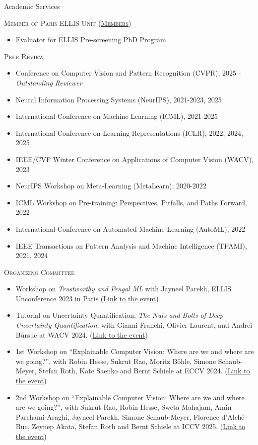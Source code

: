 \documentclass{resume} %
\begin{document}
\begin{rSection}{Academic Services}

\textsc{Member of Paris ELLIS Unit (\href{https://ellis.eu/units/paris}{Members})}
\begin{itemize}[label=$\cdot$]
    \item Evaluator for ELLIS Pre-screening PhD Program
\end{itemize}

\textsc{Peer Review}
\begin{itemize}[label=$\cdot$]
    \item Conference on Computer Vision and Pattern Recognition (CVPR), 2025 - \emph{Outstanding Reviewer}
    \item Neural Information Processing Systems (NeurIPS), 2021-2023, 2025
    \item International Conference on Machine Learning (ICML), 2021-2025
    \item International Conference on Learning Representations (ICLR), 2022, 2024, 2025
    \item IEEE/CVF Winter Conference on Applications of Computer Vision (WACV), 2023
    \item NeurIPS Workshop on Meta-Learning (MetaLearn), 2020-2022
    \item ICML Workshop on Pre-training: Perspectives, Pitfalls, and Paths Forward, 2022
    \item International Conference on Automated Machine Learning (AutoML), 2022
    \item IEEE Transactions on Pattern Analysis and Machine Intelligence (TPAMI), 2021, 2024
\end{itemize}

\textsc{Organizing Committee}
\begin{itemize}[label=$\cdot$]
    \item Workshop on \emph{Trustworthy and Frugal ML} with Jayneel Parekh, ELLIS Unconference 2023 in Paris (\href{https://ellisunconference2023.github.io/}{Link to the event})
    \item Tutorial on Uncertainty Quantification: \emph{The Nuts and Bolts of Deep Uncertainty Quantification}, with Gianni Franchi, Olivier Laurent, and Andrei Bursuc at WACV 2024. (\href{https://uqtutorial.github.io/}{Link to the event})
    \item 1st Workshop on ``Explainable Computer Vision: Where are we and where are we going?'', with Robin Hesse, Sukrut Rao, Moritz Böhle, Simone Schaub-Meyer, Stefan Roth, Kate Saenko and Bernt Schiele at ECCV 2024. (\href{https://excv-workshop.github.io/2024/}{Link to the event})
    \item 2nd Workshop on ``Explainable Computer Vision: Where are we and where are we going?'', with Sukrut Rao, Robin Hesse, Sweta Mahajam, Amin Parchami-Araghi, Jayneel Parekh, Simone Schaub-Meyer, Florence d'Alché-Buc, Zeynep Akata, Stefan Roth and Bernt Schiele at ICCV 2025. (\href{https://excv-workshop.github.io/}{Link to the event})
\end{itemize}


\end{rSection}
\end{document}
